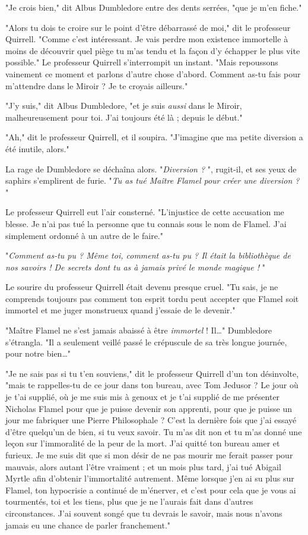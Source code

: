 "Je crois bien," dit Albus Dumbledore entre des dents serrées, "que je m'en fiche."

"Alors tu dois te croire sur le point d'être débarrassé de moi," dit le professeur Quirrell. "Comme c'est intéressant. Je vais perdre mon existence immortelle à moins de découvrir quel piège tu m'as tendu et la façon d'y échapper le plus vite possible." Le professeur Quirrell s'interrompit un instant. "Mais repoussons vainement ce moment et parlons d'autre chose d'abord. Comment as-tu fais pour m'attendre dans le Miroir ? Je te croyais ailleurs."

"J'y suis," dit Albus Dumbledore, "et je suis \emph{aussi}  dans le Miroir, malheureusement pour toi. J'ai toujours été là ; depuis le début."

"Ah," dit le professeur Quirrell, et il soupira. "J'imagine que ma petite diversion a été inutile, alors."

La rage de Dumbledore se déchaîna alors. "\emph{Diversion ?} ", rugit-il, et ses yeux de saphirs s'emplirent de furie. "\emph{Tu as tué Maître Flamel pour créer une diversion ?} "

Le professeur Quirrell eut l'air consterné. "L'injustice de cette accusation me blesse. Je n'ai pas tué la personne que tu connais sous le nom de Flamel. J'ai simplement ordonné à un autre de le faire."

"\emph{Comment as-tu pu ? Même toi, comment as-tu pu ? Il était la bibliothèque de nos savoirs ! De secrets dont tu as à jamais privé le monde magique !} "

Le sourire du professeur Quirrell était devenu presque cruel. "Tu sais, je ne comprends toujours pas comment ton esprit tordu peut accepter que Flamel soit immortel et me juger monstrueux quand j'essaie de le devenir."

"Maître Flamel ne s'est jamais abaissé à être \emph{immortel}  ! Il…" Dumbledore s'étrangla. "Il a seulement veillé passé le crépuscule de sa très longue journée, pour notre bien…"

"Je ne sais pas si tu t'en souviens," dit le professeur Quirrell d'un ton désinvolte, "mais te rappelles-tu de ce jour dans ton bureau, avec Tom Jedusor ? Le jour où je t'ai supplié, où je me suis mis à genoux et je t'ai supplié de me présenter Nicholas Flamel pour que je puisse devenir son apprenti, pour que je puisse un jour me fabriquer une Pierre Philosophale ? C'est la dernière fois que j'ai essayé d'être quelqu'un de bien, si tu veux savoir. Tu m'as dit non et tu m'as donné une leçon sur l'immoralité de la peur de la mort. J'ai quitté ton bureau amer et furieux. Je me suis dit que si mon désir de ne pas mourir me ferait passer pour mauvais, alors autant l'être vraiment ; et un mois plus tard, j'ai tué Abigail Myrtle afin d'obtenir l'immortalité autrement. Même lorsque j'en ai su plus sur Flamel, ton hypocrisie a continué de m'énerver, et c'est pour cela que je vous ai tourmentés, toi et les tiens, plus que je ne l'aurais fait dans d'autres circonstances. J'ai souvent songé que tu devrais le savoir, mais nous n'avons jamais eu une chance de parler franchement."

